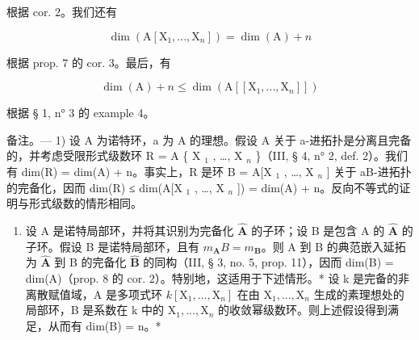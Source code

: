根据 cor. 2。我们还有

\[
\dim (\mathrm{A} [ \mathrm{X} _ {1},..., \mathrm{X} _ {n} ]) = \dim (\mathrm{A}) + n
\]

根据 prop. 7 的 cor. 3。最后，有

\[
\dim (\mathrm{A}) + n \leqslant \dim (\mathrm{A} [ [ \mathrm{X} _ {1},..., \mathrm{X} _ {n} ] ])
\]

根据 § 1, n° 3 的 example 4。

备注。--- 1) 设 A 为诺特环，a 为 A 的理想。假设 A 关于 a-进拓扑是分离且完备的，并考虑受限形式级数环 R = A \{ X \(_{1}\) , \ldots, X \(_{n}\) \}（III, § 4, n° 2, def. 2）。我们有 dim(R) = dim(A) + n。事实上，R 是环 B = A{[}X \(_{1}\) , \ldots, X \(_{n}\) {]} 关于 aB-进拓扑的完备化，因而 dim(R) ≤ dim(A{[}X \(_{1}\) , \ldots, X \(_{n}\) {]}) = dim(A) + n。反向不等式的证明与形式级数的情形相同。

\begin{enumerate}
\def\labelenumi{\arabic{enumi})}
\setcounter{enumi}{1}
\tightlist
\item
  设 A 是诺特局部环，并将其识别为完备化 \(\hat{\mathbf{A}}\) 的子环；设 B 是包含 A 的 \(\hat{\mathbf{A}}\) 的子环。假设 B 是诺特局部环，且有 \(m_{\mathbf{A}}B = m_{\mathbf{B}}\)。则 A 到 B 的典范嵌入延拓为 \(\hat{\mathbf{A}}\) 到 B 的完备化 \(\hat{\mathbf{B}}\) 的同构（III, § 3, no. 5, prop. 11），因而 dim(B) = dim(A)（prop. 8 的 cor. 2）。特别地，这适用于下述情形。* 设 k 是完备的非离散赋值域，A 是多项式环 \(k[\mathrm{X}_1, ..., \mathrm{X}_n]\) 在由 \(\mathrm{X}_1, ..., \mathrm{X}_n\) 生成的素理想处的局部环，B 是系数在 k 中的 \(\mathrm{X}_1, ..., \mathrm{X}_n\) 的收敛幂级数环。则上述假设得到满足，从而有 dim(B) = n。*
\end{enumerate}

